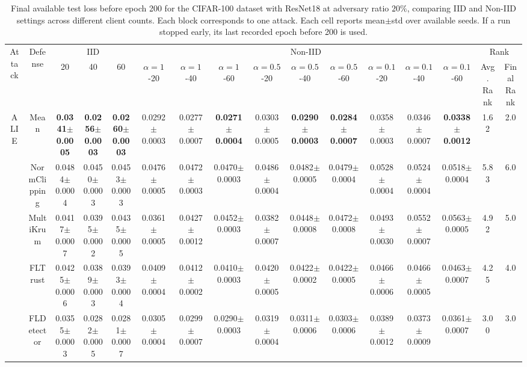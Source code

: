 \begin{table}[t]
\renewcommand{\arraystretch}{1.0}
\setlength{\tabcolsep}{3.3pt}
\caption{Final available test loss before epoch 200 for the CIFAR-100 dataset with ResNet18 at adversary ratio $20\%$, comparing IID and Non-IID settings across different client counts. Each block corresponds to one attack. Each cell reports mean$\pm$std over available seeds. If a run stopped early, its last recorded epoch before 200 is used.}
\label{tablossclientscifar100resnet18adv02ranked}
\centering\scriptsize
\begin{tabular}{c c c c c c c c c c c c c c c c}
\toprule
\multirow{2}{*}{Attack} & \multirow{2}{*}{Defense} & \multicolumn{3}{c}{IID} & \multicolumn{9}{c}{Non-IID} & \multicolumn{2}{c}{Rank} \\
\cmidrule(lr){3-5}\cmidrule(lr){6-14}\cmidrule(lr){15-16}
& & 20 & 40 & 60 & $\alpha=1$-20 & $\alpha=1$-40 & $\alpha=1$-60 & $\alpha=0.5$-20 & $\alpha=0.5$-40 & $\alpha=0.5$-60 & $\alpha=0.1$-20 & $\alpha=0.1$-40 & $\alpha=0.1$-60 & Avg. Rank & Final Rank \\
\midrule
\multirow{6}{*}{ALIE} & Mean & \textbf{0.0341$\pm$0.0005} & \textbf{0.0256$\pm$0.0003} & \textbf{0.0260$\pm$0.0003} & 0.0292$\pm$0.0003 & 0.0277$\pm$0.0007 & \textbf{0.0271$\pm$0.0004} & 0.0303$\pm$0.0005 & \textbf{0.0290$\pm$0.0003} & \textbf{0.0284$\pm$0.0007} & 0.0358$\pm$0.0003 & 0.0346$\pm$0.0007 & \textbf{0.0338$\pm$0.0012} & 1.62 & 2.0 \\
 & NormClipping & 0.0484$\pm$0.0004 & 0.0450$\pm$0.0003 & 0.0453$\pm$0.0003 & 0.0476$\pm$0.0005 & 0.0472$\pm$0.0003 & 0.0470$\pm$0.0003 & 0.0486$\pm$0.0004 & 0.0482$\pm$0.0005 & 0.0479$\pm$0.0004 & 0.0528$\pm$0.0004 & 0.0524$\pm$0.0004 & 0.0518$\pm$0.0004 & 5.83 & 6.0 \\
 & MultiKrum & 0.0417$\pm$0.0007 & 0.0395$\pm$0.0002 & 0.0435$\pm$0.0005 & 0.0361$\pm$0.0005 & 0.0427$\pm$0.0012 & 0.0452$\pm$0.0003 & 0.0382$\pm$0.0007 & 0.0448$\pm$0.0008 & 0.0472$\pm$0.0008 & 0.0493$\pm$0.0030 & 0.0552$\pm$0.0007 & 0.0563$\pm$0.0005 & 4.92 & 5.0 \\
 & FLTrust & 0.0425$\pm$0.0006 & 0.0389$\pm$0.0003 & 0.0393$\pm$0.0004 & 0.0409$\pm$0.0004 & 0.0412$\pm$0.0002 & 0.0410$\pm$0.0003 & 0.0420$\pm$0.0005 & 0.0422$\pm$0.0002 & 0.0422$\pm$0.0005 & 0.0466$\pm$0.0006 & 0.0466$\pm$0.0005 & 0.0463$\pm$0.0007 & 4.25 & 4.0 \\
 & FLDetector & 0.0355$\pm$0.0003 & 0.0282$\pm$0.0005 & 0.0281$\pm$0.0007 & 0.0305$\pm$0.0004 & 0.0299$\pm$0.0007 & 0.0290$\pm$0.0003 & 0.0319$\pm$0.0004 & 0.0311$\pm$0.0006 & 0.0303$\pm$0.0006 & 0.0389$\pm$0.0012 & 0.0373$\pm$0.0009 & 0.0361$\pm$0.0007 & 3.00 & 3.0 \\

\end{tabular}
\end{table}
